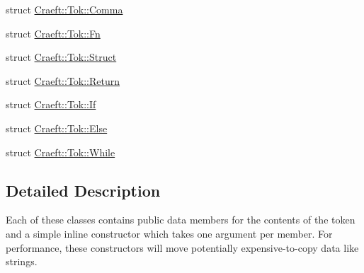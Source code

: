 \begin{DoxyCompactItemize}
\item 
struct \hyperlink{struct_craeft_1_1_tok_1_1_comma}{Craeft\+::\+Tok\+::\+Comma}
\item 
struct \hyperlink{struct_craeft_1_1_tok_1_1_fn}{Craeft\+::\+Tok\+::\+Fn}
\item 
struct \hyperlink{struct_craeft_1_1_tok_1_1_struct}{Craeft\+::\+Tok\+::\+Struct}
\item 
struct \hyperlink{struct_craeft_1_1_tok_1_1_return}{Craeft\+::\+Tok\+::\+Return}
\item 
struct \hyperlink{struct_craeft_1_1_tok_1_1_if}{Craeft\+::\+Tok\+::\+If}
\item 
struct \hyperlink{struct_craeft_1_1_tok_1_1_else}{Craeft\+::\+Tok\+::\+Else}
\item 
struct \hyperlink{struct_craeft_1_1_tok_1_1_while}{Craeft\+::\+Tok\+::\+While}
\end{DoxyCompactItemize}


\subsection{Detailed Description}
Each of these classes contains public data members for the contents of the token and a simple inline constructor which takes one argument per member. For performance, these constructors will {\ttfamily move} potentially expensive-\/to-\/copy data like strings. 